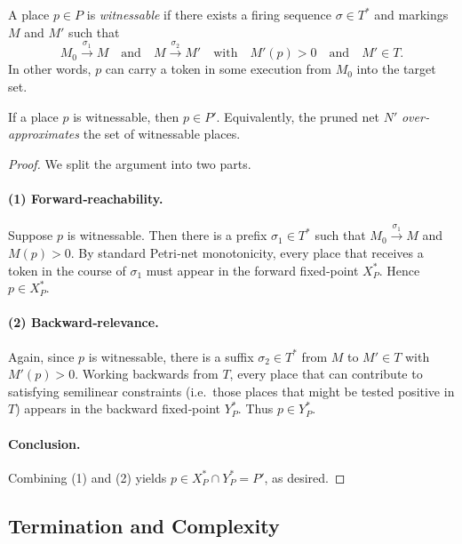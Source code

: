 	\begin{definition}
		A place $p\in P$ is \emph{witnessable} if there exists a firing
		sequence $\sigma\in T^*$ and markings $M$ and $M'$ such that
		\[
		M_0 \xrightarrow{\sigma_1} M
		\quad\text{and}\quad
		M \xrightarrow{\sigma_2} M'
		\quad\text{with}\quad
		M'(p)>0
		\quad\text{and}\quad
		M'\in T.
		\]
		In other words, $p$ can carry a token in some execution from $M_0$ into the target set.
	\end{definition}
	
	\begin{theorem}
		\label{thm:invariant}
		If a place $p$ is witnessable, then $p\in P'$.  Equivalently, the
		pruned net $N'$ \emph{over‐approximates} the set of witnessable places.
	\end{theorem}
	
	\begin{proof}
		We split the argument into two parts.
		
		\paragraph{(1) Forward‐reachability.}
		Suppose $p$ is witnessable.  Then there is a prefix
		$\sigma_1\in T^*$ such that $M_0\xrightarrow{\sigma_1}M$ and
		$M(p)>0$.  By standard Petri‐net monotonicity, every place that
		receives a token in the course of $\sigma_1$ must appear in the
		forward fixed‐point $X^*_P$.  Hence $p\in X^*_P$.
		
		\paragraph{(2) Backward‐relevance.}
		Again, since $p$ is witnessable, there is a suffix
		$\sigma_2\in T^*$ from $M$ to $M'\in T$ with $M'(p)>0$.  Working
		backwards from $T$, every place that can contribute to satisfying
		semilinear constraints (i.e.\ those places that might be tested
		positive in $T$) appears in the backward fixed‐point $Y^*_P$.  Thus
		$p\in Y^*_P$.
		
		\paragraph{Conclusion.}
		Combining (1) and (2) yields $p\in X^*_P\cap Y^*_P = P'$, as desired.
	\end{proof}
	
	\subsection{Termination and Complexity}
	

